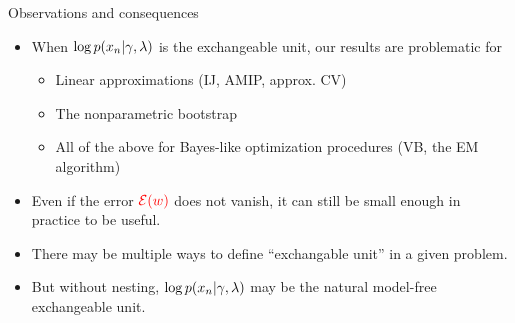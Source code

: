 \begin{frame}{Observations and consequences}

\begin{center}

\end{center}

\begin{minipage}{0.58\linewidth}
    \begin{itemize}
    \item<2-> When $\log p(x_n \vert \gamma, \lambda)$ is
    the exchangeable unit,
    our results are problematic for
    \begin{itemize}
    \item Linear approximations (IJ, AMIP, approx. CV)
    \item The nonparametric bootstrap
    \item All of the above for Bayes-like optimization procedures
        (VB, the EM algorithm)
    \end{itemize}
    \item<3-> Even if the error $\textcolor{red}{\mathcal{E}(w)}$ does not vanish,
    it can still be small enough in practice to be useful.
    \item<4-> There may be multiple ways to define ``exchangable unit'' in a given
    problem.
    \item<5-> But without nesting,
    $\log p(x_n \vert \gamma, \lambda)$
    may be the natural model-free exchangeable unit.
    \end{itemize}
\end{minipage}
%
\begin{minipage}{0.4\linewidth}
\ElectionData{}
\end{minipage}


\end{frame}

\begin{frame}

\footnotesize


\begingroup
\renewcommand{\section}[2]{}%

\endgroup

%
\end{frame}
